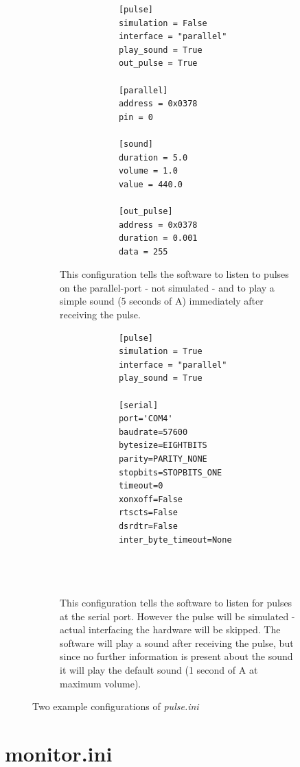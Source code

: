 \documentclass[12pt,a4paper]{book}
\begin{document}
\begin{figure}
	\centering
	\begin{subfigure}[t]{0.4\linewidth}
		\begin{framed}
			\begin{verbatim}
			[pulse]
			simulation = False
			interface = "parallel"
			play_sound = True
			out_pulse = True

			[parallel]
			address = 0x0378
			pin = 0

			[sound]
			duration = 5.0
			volume = 1.0
			value = 440.0
			
			[out_pulse]
			address = 0x0378
			duration = 0.001
			data = 255			
			\end{verbatim}
		\end{framed}
		\caption{This configuration tells the software to listen to pulses on the parallel-port - not simulated - and to play a simple sound (5 seconds of A) immediately after receiving the pulse.}
		\label{fig:pulseiniparallel}
	\end{subfigure}
	\quad
	\begin{subfigure}[t]{0.4\linewidth}
		\begin{framed}%
			\begin{verbatim}
			[pulse]
			simulation = True
			interface = "parallel"
			play_sound = True
			
			[serial]
			port='COM4'
			baudrate=57600
			bytesize=EIGHTBITS
			parity=PARITY_NONE
			stopbits=STOPBITS_ONE
			timeout=0
			xonxoff=False
			rtscts=False
			dsrdtr=False
			inter_byte_timeout=None
			
			
			
			\end{verbatim}
		\end{framed}
		\caption{This configuration tells the software to listen for pulses at the serial port. However the pulse will be simulated - actual interfacing the hardware will be skipped. The software will play a sound after receiving the pulse, but since no further information is present about the sound it will play the default sound (1 second of A at maximum volume).}
		\label{fig:pulseiniserial}
	\end{subfigure}
	
	\caption{Two example configurations of \textit{pulse.ini}}
	
\end{figure}

\section{monitor.ini}\label{sec:monitorini}
\end{document}
